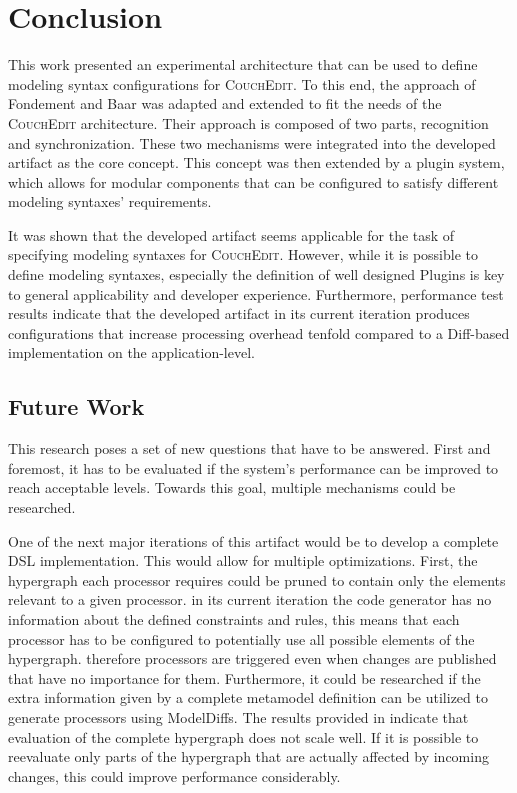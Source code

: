 \chapter{Conclusion}
\label{ch:conclusion}

This work presented an experimental architecture that can be used to define modeling syntax configurations for \textsc{CouchEdit}. To this end, the approach of Fondement and Baar \cite{fondement_making_2005} was adapted and extended to fit the needs of the \textsc{CouchEdit} architecture. Their approach is composed of two parts, recognition and synchronization. These two mechanisms were integrated into the developed artifact as the core concept. This concept was then extended by a plugin system, which allows for modular components that can be configured to satisfy different modeling syntaxes' requirements.

It was shown that the developed artifact seems applicable for the task of specifying modeling syntaxes for \textsc{CouchEdit}. However, while it is possible to define modeling syntaxes, especially the definition of well designed Plugins is key to general applicability and developer experience. Furthermore, performance test results indicate that the developed artifact in its current iteration produces configurations that increase processing overhead tenfold compared to a Diff-based implementation on the application-level.  

\section{Future Work}
This research poses a set of new questions that have to be answered. First and foremost, it has to be evaluated if the system's performance can be improved to reach acceptable levels. Towards this goal, multiple mechanisms could be researched.

One of the next major iterations of this artifact would be to develop a complete DSL implementation. This would allow for multiple optimizations. First, the hypergraph each processor requires could be pruned to contain only the elements relevant to a given processor. in its current iteration the code generator has no information about the defined constraints and rules, this means that each processor has to be configured to potentially use all possible elements of the hypergraph. therefore processors are triggered even when changes are published that have no importance for them. Furthermore, it could be researched if the extra information given by a complete metamodel definition can be utilized to generate processors using ModelDiffs. The results provided in  indicate that evaluation of the complete hypergraph does not scale well. If it is possible to reevaluate only parts of the hypergraph that are actually affected by incoming changes, this could improve performance considerably.

